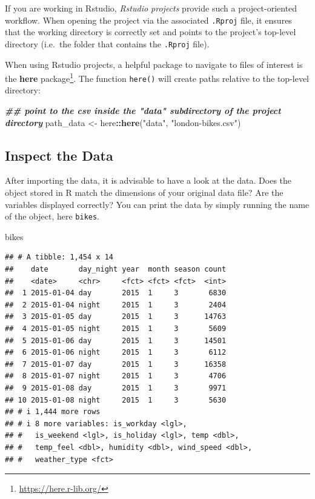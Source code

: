 \documentclass[
]{krantz}
\makeatletter
\newenvironment{Shaded}{\begin{snugshade}}{\end{snugshade}}
\newcommand{\DocumentationTok}[1]{\textcolor[rgb]{0.37,0.37,0.37}{\textbf{\textit{#1}}}}
\newcommand{\FunctionTok}[1]{\textcolor[rgb]{0.27,0.27,0.27}{\textbf{#1}}}
\newcommand{\NormalTok}[1]{#1}
\newcommand{\OtherTok}[1]{\textcolor[rgb]{0.37,0.37,0.37}{#1}}
\newcommand{\SpecialCharTok}[1]{\textcolor[rgb]{0.43,0.43,0.43}{\textbf{#1}}}
\newcommand{\StringTok}[1]{\textcolor[rgb]{0.5,0.5,0.5}{#1}}
\renewcommand{\href}[2]{#2\footnote{\url{#1}}}
\newenvironment{kframe}{%
\medskip{}
\setlength{\fboxsep}{.8em}
 \def\at@end@of@kframe{}%
 \ifinner\ifhmode%
  \def\at@end@of@kframe{\end{minipage}}%
  \begin{minipage}{\columnwidth}%
 \fi\fi%
 \def\FrameCommand##1{\hskip\@totalleftmargin \hskip-\fboxsep
 \colorbox{shadecolor}{##1}\hskip-\fboxsep
     \hskip-\linewidth \hskip-\@totalleftmargin \hskip\columnwidth}%
 \MakeFramed {\advance\hsize-\width
   \@totalleftmargin\z@ \linewidth\hsize
   \@setminipage}}%
 {\par\unskip\endMakeFramed%
 \at@end@of@kframe}
\renewenvironment{Shaded}{\begin{kframe}}{\end{kframe}}
\makeatother
\begin{document}
If you are working in Rstudio, \emph{Rstudio projects} provide such a project-oriented workflow. When opening the project via the associated \texttt{.Rproj} file, it ensures that the working directory is correctly set and points to the project's top-level directory (i.e.~the folder that contains the \texttt{.Rproj} file).

When using Rstudio projects, a helpful package to navigate to files of interest is the \href{https://here.r-lib.org/}{\textbf{here} package}. The function \texttt{here()} will create paths relative to the top-level directory:

\begin{Shaded}
\begin{Highlighting}[]
\DocumentationTok{\#\# point to the csv inside the "data" subdirectory of the project directory}
\NormalTok{path\_data }\OtherTok{\textless{}{-}}\NormalTok{ here}\SpecialCharTok{::}\FunctionTok{here}\NormalTok{(}\StringTok{"data"}\NormalTok{, }\StringTok{"london{-}bikes.csv"}\NormalTok{) }
\end{Highlighting}
\end{Shaded}

\hypertarget{inspect}{%
\subsection{Inspect the Data}\label{inspect}}

After importing the data, it is advisable to have a look at the data. Does the object stored in R match the dimensions of your original data file? Are the variables displayed correctly? You can print the data by simply running the name of the object, here \texttt{bikes}.

\begin{Shaded}
\begin{Highlighting}[]
\NormalTok{bikes}
\end{Highlighting}
\end{Shaded}

\begin{verbatim}
## # A tibble: 1,454 x 14
##    date       day_night year  month season count
##    <date>     <chr>     <fct> <fct> <fct>  <int>
##  1 2015-01-04 day       2015  1     3       6830
##  2 2015-01-04 night     2015  1     3       2404
##  3 2015-01-05 day       2015  1     3      14763
##  4 2015-01-05 night     2015  1     3       5609
##  5 2015-01-06 day       2015  1     3      14501
##  6 2015-01-06 night     2015  1     3       6112
##  7 2015-01-07 day       2015  1     3      16358
##  8 2015-01-07 night     2015  1     3       4706
##  9 2015-01-08 day       2015  1     3       9971
## 10 2015-01-08 night     2015  1     3       5630
## # i 1,444 more rows
## # i 8 more variables: is_workday <lgl>,
## #   is_weekend <lgl>, is_holiday <lgl>, temp <dbl>,
## #   temp_feel <dbl>, humidity <dbl>, wind_speed <dbl>,
## #   weather_type <fct>
\end{verbatim}
\end{document}
